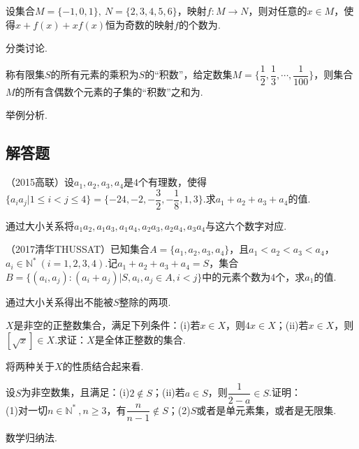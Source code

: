 \documentclass[lang=cn, zihao=4.5]{elegantbook}
\newcommand{\tk}{\uline{\hspace{4em}}}
\begin{document}
\begin{example} %
	设集合$M=\{ -1,0,1 \} , ~N=\{ 2,3,4,5,6 \}$，映射$f:M \to N$，则对任意的$x \in M$，使得$x + f(x) +xf(x)$恒为奇数的映射$f$的个数为\tk .
\end{example}
\begin{hint}
	分类讨论.
\end{hint}

\begin{example}
	称有限集$S$的所有元素的乘积为$S$的“积数”，给定数集$M= \{ \dfrac{1}{2},\dfrac{1}{3}, \cdots ,\dfrac{1}{100} \}$，则集合$M$的所有含偶数个元素的子集的“积数”之和为\tk .
\end{example}
\begin{hint}
	举例分析.
\end{hint}

\subsection*{解答题}

\begin{example} %
	（2015高联）设$a_1,a_2,a_3,a_4$是$4$个有理数，使得$\{ a_ia_j | 1 \leq i < j \leq 4 \} = \{ -24,-2,-\dfrac{3}{2},-\dfrac{1}{8},1,3 \}$.求$a_1+a_2+a_3+a_4$的值.
\end{example}
\begin{hint}
	通过大小关系将$a_1a_2,a_1a_3,a_1a_4,a_2a_3,a_2a_4,a_3a_4$与这六个数字对应.
\end{hint}

\begin{example} %
	（2017清华THUSSAT）已知集合$A= \{ a_1,a_2,a_3,a_4 \}$，且$a_1 < a_2 < a_3 < a_4$，$a_i \in \mathbb{N} ^* ~(i=1,2,3,4)$.记$a_1+a_2+a_3+a_4=S$，集合$B = \{ (a_i,a_j) : (a_i+a_j) | S, a_i,a_j \in A, i<j \}$中的元素个数为$4$个，求$a_1$的值.
\end{example}
\begin{hint}
	通过大小关系得出不能被$S$整除的两项.
\end{hint}

\begin{example} %
	$X$是非空的正整数集合，满足下列条件：(i)若$x \in X$，则$4x \in X$；(ii)若$x \in X$，则$[\sqrt{x}] \in X$.求证：$X$是全体正整数的集合.
\end{example}
\begin{hint}
	将两种关于$X$的性质结合起来看.
\end{hint}

\begin{example} %
	设$S$为非空数集，且满足：(i)$2 \notin S$；(ii)若$a \in S$，则$\dfrac{1}{2-a} \in S$.证明： \\
	(1)对一切$n \in \mathbb{N} ^{*} ~, n \geq 3$，有$\dfrac{n}{n-1} \notin S$；(2)$S$或者是单元素集，或者是无限集.
\end{example}
\begin{hint}
	数学归纳法.
\end{hint}
\end{document}
